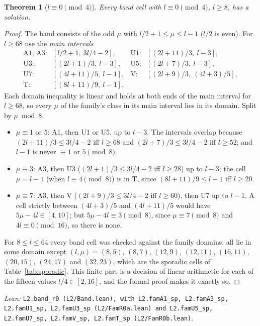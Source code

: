 \documentclass[11pt]{amsart}
\theoremstyle{plain}
\newtheorem{theorem}{Theorem}[section]
\theoremstyle{definition}
\theoremstyle{remark}
\newcommand{\lean}[1]{\par\smallskip
  {\small\raggedright\noindent\textit{Lean:} \texttt{#1}.\par}\smallskip}
\begin{document}
\begin{theorem}[$l \equiv 0 \pmod 4$]\label{thm:cov0}
Every band cell with $l \equiv 0 \pmod 4$, $l \ge 8$, has a solution.
\end{theorem}

\begin{proof}
The band consists of the odd $\mu$ with $l/2 + 1 \le \mu \le l-1$ ($l/2$ is even). For
$l \ge 68$ use the \emph{main intervals}
\[
\begin{array}{llll}
\text{A1, A3:} & [l/2+1,\ 3l/4-2], & \text{U1:} & [(2l+11)/3,\ l-3],\\
\text{U3:} & [(2l+1)/3,\ l-3], & \text{U5:} & [(2l+7)/3,\ l-3],\\
\text{U7:} & [(4l+11)/5,\ l-1], & \text{V:} & [(2l+9)/3,\ (4l+3)/5],\\
\text{T:} & [(8l+11)/9,\ l-1]. & &
\end{array}
\]
Each domain inequality is linear and holds at both ends of the main interval for
$l \ge 68$, so every $\mu$ of the family's class in its main interval lies in its domain.
Split by $\mu \bmod 8$.
\begin{itemize}
\item $\mu \equiv 1$ or $5$: A1, then U1 or U5, up to $l-3$. The intervals overlap
  because $(2l+11)/3 \le 3l/4 - 2$ iff $l \ge 68$ and $(2l+7)/3 \le 3l/4-2$ iff
  $l \ge 52$; and $l - 1$ is never $\equiv 1$ or $5 \pmod 8$.
\item $\mu \equiv 3$: A3, then U3 ($(2l+1)/3 \le 3l/4 - 2$ iff $l \ge 28$) up to $l-3$;
  the cell $\mu = l-1$ (when $l \equiv 4 \pmod 8$) is in T, since
  $(8l+11)/9 \le l-1$ iff $l \ge 20$.
\item $\mu \equiv 7$: A3, then V ($(2l+9)/3 \le 3l/4-2$ iff $l \ge 60$), then U7 up to
  $l-1$. A cell strictly between $(4l+3)/5$ and $(4l+11)/5$ would have
  $5\mu - 4l \in [4,10]$; but $5\mu - 4l \equiv 3 \pmod 8$, since $\mu \equiv 7 \pmod 8$
  and $4l \equiv 0 \pmod{16}$, so there is none.
\end{itemize}
For $8 \le l \le 64$ every band cell was checked against the family domains: all lie in
some domain except $(l,\mu) = (8,5)$, $(8,7)$, $(12,9)$, $(12,11)$, $(16,11)$,
$(20,15)$, $(24,17)$ and $(32,23)$, which are the sporadic cells of
Table~\ref{tab:sporadic}. This finite part is a decision of linear arithmetic for each
of the fifteen values $l/4 \in [2,16]$, and the formal proof makes it exactly so.
\end{proof}
\lean{L2.band\_r0 (L2/Band.lean), with L2.famA1\_sp, L2.famA3\_sp, L2.famU1\_sp, L2.famU3\_sp
(L2/FamR0a.lean) and L2.famU5\_sp, L2.famU7\_sp, L2.famV\_sp, L2.famT\_sp
(L2/FamR0b.lean)}
\end{document}
